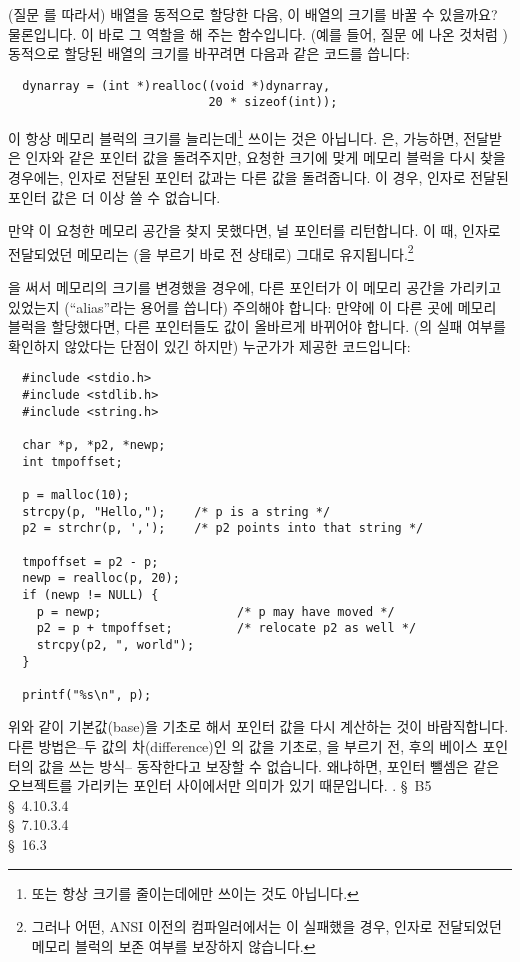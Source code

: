 \begin{faq}
        (질문 를 따라서) 배열을 동적으로 할당한 다음, 이 배열의 크기를
        바꿀 수 있을까요?
\A
        물론입니다. 이 바로 그 역할을 해 주는 함수입니다.
        (예를 들어, 질문 에 나온 것처럼 ) 동적으로 할당된
        배열의 크기를 바꾸려면 다음과 같은 코드를 씁니다:
\begin{verbatim}
  dynarray = (int *)realloc((void *)dynarray,
                            20 * sizeof(int));
\end{verbatim}
        이 항상 메모리 블럭의 크기를 늘리는데\footnote{또는 항상
        크기를 줄이는데에만 쓰이는 것도 아닙니다.} 쓰이는 것은 아닙니다.
        은, 가능하면, 전달받은 인자와 같은 포인터 값을 돌려주지만,
        요청한 크기에 맞게 메모리 블럭을 다시 찾을 경우에는, 인자로 전달된
        포인터 값과는 다른 값을 돌려줍니다. 이 경우, 인자로 전달된 포인터 값은
        더 이상 쓸 수 없습니다.

        만약 이 요청한 메모리 공간을 찾지 못했다면, 널 포인터를
        리턴합니다. 이 때, 인자로 전달되었던 메모리는 (을 부르기
        바로 전 상태로) 그대로 유지됩니다.\footnote{그러나 어떤, ANSI 이전의
        컴파일러에서는 이 실패했을 경우, 인자로 전달되었던 메모리
        블럭의 보존 여부를 보장하지 않습니다.}

        을 써서 메모리의 크기를 변경했을 경우에, 다른 포인터가
        이 메모리 공간을 가리키고 있었는지 (``alias''라는 용어를 씁니다)
        주의해야 합니다: 만약에 이 다른 곳에 메모리 블럭을 할당했다면,
        다른 포인터들도 값이 올바르게 바뀌어야 합니다. (의 실패 여부를
        확인하지 않았다는 단점이 있긴 하지만) 누군가가 제공한 코드입니다:

\begin{verbatim}
  #include <stdio.h>
  #include <stdlib.h>
  #include <string.h>

  char *p, *p2, *newp;
  int tmpoffset;

  p = malloc(10);
  strcpy(p, "Hello,");    /* p is a string */
  p2 = strchr(p, ',');    /* p2 points into that string */

  tmpoffset = p2 - p;
  newp = realloc(p, 20);
  if (newp != NULL) {
    p = newp;                   /* p may have moved */
    p2 = p + tmpoffset;         /* relocate p2 as well */
    strcpy(p2, ", world");
  }

  printf("%s\n", p);
\end{verbatim}
        위와 같이 기본값(base)을 기초로 해서 포인터 값을 다시 계산하는 것이
        바람직합니다. 다른 방법은--두 값의 차(difference)인 의
        값을 기초로, 을 부르기 전, 후의 베이스 포인터의 값을 쓰는
        방식-- 동작한다고 보장할 수 없습니다. 왜냐하면, 포인터 뺄셈은 같은
        오브젝트를 가리키는 포인터 사이에서만 의미가 있기 때문입니다.
        .
\R
        \cite{kr2} \S\ B5  \\
        \cite{ansi} \S\ 4.10.3.4 \\
        \cite{c89} \S\ 7.10.3.4 \\
        \cite{hs} \S\ 16.3 
\end{faq}

